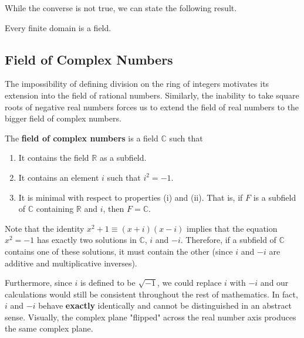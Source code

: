   While the converse is not true, we can state the following result. 

  \begin{theorem}
    Every finite domain is a field. 
  \end{theorem}

\subsection{Field of Complex Numbers}

  The impossibility of defining division on the ring of integers motivates its extension into the field of rational numbers. Similarly, the inability to take square roots of negative real numbers forces us to extend the field of real numbers to the bigger field of complex numbers. 

  \begin{definition}
    The \textbf{field of complex numbers} is a field $\mathbb{C}$ such that 
    \begin{enumerate}
      \item It contains the field $\mathbb{R}$ as a subfield. 
      \item It contains an element $i$ such that $i^2 = -1$.
      \item It is minimal with respect to properties (i) and (ii). That is, if $F$ is a subfield of $\mathbb{C}$ containing $\mathbb{R}$ and $i$, then $F = \mathbb{C}$. 
    \end{enumerate}
  \end{definition}

  Note that the identity $x^2 + 1 \equiv (x + i) (x - i)$ implies that the equation $x^2 = -1$ has exactly two solutions in $\mathbb{C}$, $i$ and $-i$. Therefore, if a subfield of $\mathbb{C}$ contains one of these solutions, it must contain the other (since $i$ and $-i$ are additive and multiplicative inverses). 

  Furthermore, since $i$ is defined to be $\sqrt{-1}$, we could replace $i$ with $-i$ and our calculations would still be consistent throughout the rest of mathematics. In fact, $i$ and $-i$ behave \textbf{exactly} identically and cannot be distinguished in an abstract sense. Visually, the complex plane "flipped" across the real number axis produces the same complex plane. 

